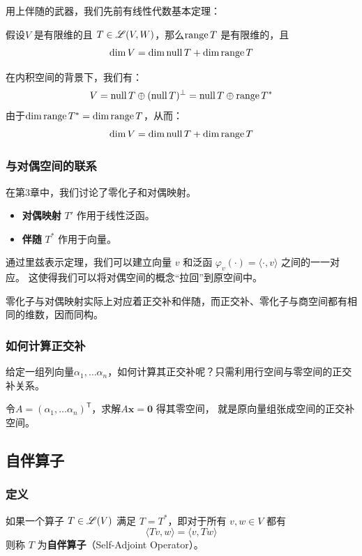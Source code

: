 用上伴随的武器，我们先前有线性代数基本定理：

\begin{theorem}[线性映射基本定理]
    假设\(V\) 是有限维的且 \(T \in \mathscr{L}(V,W)\)，那么\(\operatorname{range}
    T\) 是有限维的，且\[
        \dim V = \dim \operatorname{null} T + \dim \operatorname{range} T
    \]
\end{theorem}

在内积空间的背景下，我们有：
\[
    V = \operatorname{null} T \oplus (\operatorname{null} T)^\perp = \operatorname{null} T
    \oplus \operatorname{range} T^*
\]
由于\(\dim \operatorname{range} T^* = \dim \operatorname{range} T\)，从而：
\[
    \dim V = \dim \operatorname{null} T + \dim \operatorname{range} T
\]

\subsubsection{与对偶空间的联系}
在第3章中，我们讨论了零化子和对偶映射。
\begin{itemize}
    \item \textbf{对偶映射} \(T'\) 作用于线性泛函。
    \item \textbf{伴随} \(T^*\) 作用于向量。
\end{itemize}
通过里兹表示定理，我们可以建立向量 \(v\) 和泛函
\(\varphi_v(\cdot) = \langle \cdot, v \rangle\) 之间的一一对应。
这使得我们可以将对偶空间的概念``拉回''到原空间中。

零化子与对偶映射实际上对应着正交补和伴随，而正交补、零化子与商空间都有相同的维数，因而同构。
\subsubsection{如何计算正交补}
给定一组列向量\(\alpha_{1},\dots \alpha_{n}\)，如何计算其正交补呢？只需利用行空间与零空间的正交补关系。

令\(A = (\alpha_{1},\dots \alpha_{n})^{\mathsf{T}}\)，求解\(A \bm{x}=\bm{0}\) 得其零空间，
就是原向量组张成空间的正交补空间。
\subsection{自伴算子}

\subsubsection{定义}
\begin{definition}[自伴算子]
    如果一个算子 \(T \in \mathscr{L}(V)\) 满足 \(T = T^*\)，即对于所有 \(v, w \in V\) 都有
    \[
        \langle Tv, w \rangle = \langle v, Tw \rangle
    \]
    则称 \(T\) 为\textbf{自伴算子}（Self-Adjoint Operator）。
\end{definition}

